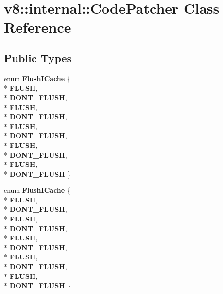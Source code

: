 \hypertarget{classv8_1_1internal_1_1_code_patcher}{}\section{v8\+:\+:internal\+:\+:Code\+Patcher Class Reference}
\label{classv8_1_1internal_1_1_code_patcher}
\subsection*{Public Types}
\begin{DoxyCompactItemize}
\item 
enum {\bfseries Flush\+I\+Cache} \{ \\*
{\bfseries F\+L\+U\+SH}, 
\\*
{\bfseries D\+O\+N\+T\+\_\+\+F\+L\+U\+SH}, 
\\*
{\bfseries F\+L\+U\+SH}, 
\\*
{\bfseries D\+O\+N\+T\+\_\+\+F\+L\+U\+SH}, 
\\*
{\bfseries F\+L\+U\+SH}, 
\\*
{\bfseries D\+O\+N\+T\+\_\+\+F\+L\+U\+SH}, 
\\*
{\bfseries F\+L\+U\+SH}, 
\\*
{\bfseries D\+O\+N\+T\+\_\+\+F\+L\+U\+SH}, 
\\*
{\bfseries F\+L\+U\+SH}, 
\\*
{\bfseries D\+O\+N\+T\+\_\+\+F\+L\+U\+SH}
 \}\hypertarget{classv8_1_1internal_1_1_code_patcher_abae8f363a339ca649dca5491f4f29a8d}{}\label{classv8_1_1internal_1_1_code_patcher_abae8f363a339ca649dca5491f4f29a8d}

\item 
enum {\bfseries Flush\+I\+Cache} \{ \\*
{\bfseries F\+L\+U\+SH}, 
\\*
{\bfseries D\+O\+N\+T\+\_\+\+F\+L\+U\+SH}, 
\\*
{\bfseries F\+L\+U\+SH}, 
\\*
{\bfseries D\+O\+N\+T\+\_\+\+F\+L\+U\+SH}, 
\\*
{\bfseries F\+L\+U\+SH}, 
\\*
{\bfseries D\+O\+N\+T\+\_\+\+F\+L\+U\+SH}, 
\\*
{\bfseries F\+L\+U\+SH}, 
\\*
{\bfseries D\+O\+N\+T\+\_\+\+F\+L\+U\+SH}, 
\\*
{\bfseries F\+L\+U\+SH}, 
\\*
{\bfseries D\+O\+N\+T\+\_\+\+F\+L\+U\+SH}
 \}\hypertarget{classv8_1_1internal_1_1_code_patcher_abae8f363a339ca649dca5491f4f29a8d}{}\label{classv8_1_1internal_1_1_code_patcher_abae8f363a339ca649dca5491f4f29a8d}


\end{DoxyCompactItemize}
